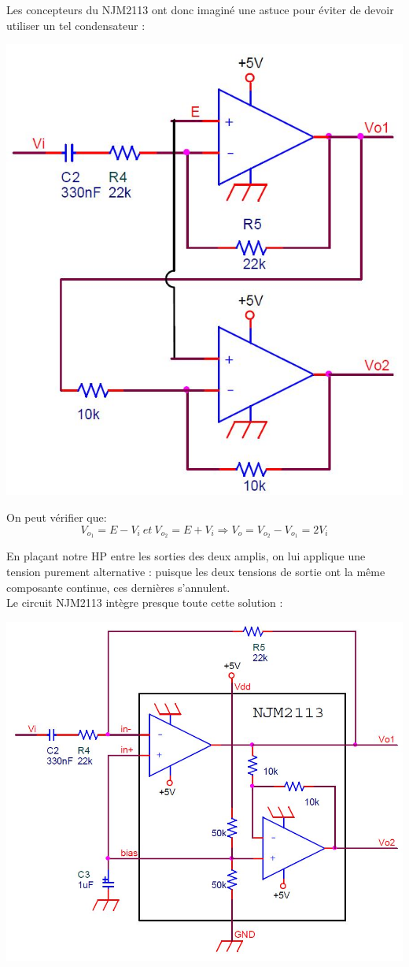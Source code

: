 Les concepteurs du NJM2113 ont donc imaginé une astuce pour éviter de devoir utiliser un tel condensateur :
\begin{center}
\includegraphics[scale=0.5]{astuceLM4864.JPG}
\label{astuceLM4864}
\end{center}
 On peut vérifier que:
 $$V_{o_1}=E-V_i\ et\ V_{o_2}=E+V_i \Rightarrow V_o=V_{o_2}-V_{o_1}=2V_i$$

En plaçant notre HP entre les sorties des deux amplis, on lui applique une tension purement alternative : puisque les deux tensions de sortie ont la même composante continue, ces dernières s'annulent.\\

Le circuit NJM2113 intègre presque toute cette solution :
\begin{center}
\includegraphics[scale=0.45]{NJM.JPG}
\label{LM4864}
\end{center}

